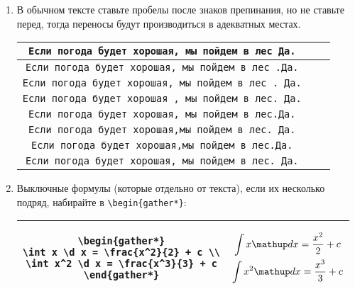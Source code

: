 \begin{enumerate}
\item
	В обычном тексте ставьте пробелы после знаков препинания, но не ставьте перед, тогда переносы будут производиться
	в адекватных местах.
	\begin{center}\begin{tabular}{|c|c|c|}
		\hline \verb!Если погода будет хорошая, мы пойдем в лес Да.! \bad \\
		\hline \verb!Если погода будет хорошая, мы пойдем в лес .Да.! \bad \\
		\hline \verb!Если погода будет хорошая, мы пойдем в лес . Да.! \bad \\
		\hline \verb!Если погода будет хорошая , мы пойдем в лес. Да.! \bad \\
		\hline \verb!Если погода будет хорошая, мы пойдем в лес.Да.! \bad \\
		\hline \verb!Если погода будет хорошая,мы пойдем в лес. Да.! \bad \\
		\hline \verb!Если погода будет хорошая,мы пойдем в лес.Да.! \bad \\
		\hline \verb!Если погода будет хорошая, мы пойдем в лес. Да.! \ok \\
		\hline
    \end{tabular}\end{center}

\item
	Выключные формулы (которые отдельно от текста), если их несколько подряд, набирайте в \verb'\begin{gather*}':
	\begin{center}\begin{tabular}{|c|c|}
	\hline
		\begin{minipage}{8cm}
\begin{verbatim}
\begin{gather*}
\int x \d x = \frac{x^2}{2} + c \\
\int x^2 \d x = \frac{x^3}{3} + c
\end{gather*}
\end{verbatim}
		\end{minipage}
		&
		\begin{minipage}{8cm}
			\begin{gather*}
				\int x \d x = \frac{x^2}{2} + c \\
				\int x^2 \d x = \frac{x^3}{3} + c
			\end{gather*}
		\end{minipage} \\
		\hline
	\end{tabular}\end{center}


\end{enumerate}

